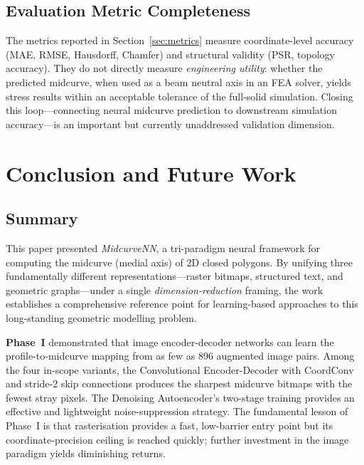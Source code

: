 \documentclass[journal]{IEEEtran}
\begin{document}
\subsection{Evaluation Metric Completeness}

The metrics reported in Section~\ref{sec:metrics} measure coordinate-level
accuracy (MAE, RMSE, Hausdorff, Chamfer) and structural validity (PSR,
topology accuracy).  They do not directly measure \emph{engineering utility}:
whether the predicted midcurve, when used as a beam neutral axis in an FEA
solver, yields stress results within an acceptable tolerance of the full-solid
simulation.  Closing this loop—connecting neural midcurve prediction to
downstream simulation accuracy—is an important but currently unaddressed
validation dimension.

\section{Conclusion and Future Work}
\label{sec:conclusion}

\subsection{Summary}

This paper presented \textit{MidcurveNN}, a tri-paradigm neural framework for
computing the midcurve (medial axis) of 2D closed polygons.  By unifying three
fundamentally different representations—raster bitmaps, structured text, and
geometric graphs—under a single \emph{dimension-reduction} framing, the work
establishes a comprehensive reference point for learning-based approaches to
this long-standing geometric modelling problem.

\textbf{Phase~I} demonstrated that image encoder-decoder networks can learn the
profile-to-midcurve mapping from as few as 896 augmented image pairs.  Among
the four in-scope variants, the Convolutional Encoder-Decoder with CoordConv
and stride-2 skip connections produces the sharpest midcurve bitmaps with the
fewest stray pixels.  The Denoising Autoencoder's two-stage training provides
an effective and lightweight noise-suppression strategy.  The fundamental
lesson of Phase~I is that rasterisation provides a fast, low-barrier entry
point but its coordinate-precision ceiling is reached quickly; further
investment in the image paradigm yields diminishing returns.
\end{document}
